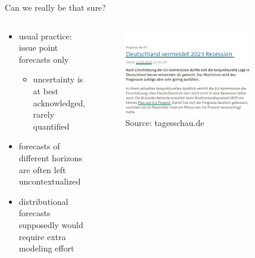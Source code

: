 \documentclass[en]{sdqbeamer}
\begin{document}
\begin{frame}[t]{Can we really be that sure?}

\begin{columns}
\begin{column}{0.4\textwidth}
   	\begin{itemize}
         \item usual practice: issue point forecasts only
         \begin{itemize}
	    \item uncertainty is at best acknowledged, rarely quantified \bigskip
	\end{itemize}
        \item forecasts of different horizons are often left uncontextualized \bigskip
        \item distributional forecasts supposedly would require extra modeling effort
    \end{itemize}
    \vspace{2cm}
\end{column}
\begin{column}{0.6\textwidth}
    \begin{figure}
        \centering
        \includegraphics[width=0.8\textwidth]{figures/recession_light_underlined_green_smaller_date.jpg} 
        \caption{Source: tagesschau.de}
        \label{fig:enter-label}
    \end{figure}     
\end{column}
\end{columns}
\end{frame}
\end{document}
